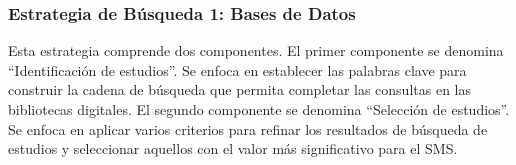 \subsubsection{Estrategia de Búsqueda 1: Bases de Datos}\label{subsubsec:busqueda-bases-datos}

\newcommand{\wos}{933}
\newcommand{\ieee}{3022}
\newcommand{\spr}{35788}
\newcommand{\tf}{761}
\newcommand{\sd}{2539}
\newcommand{\tot}{43043}
\newcommand{\wosp}{\fpeval{round (\wos*100/\tot,2)}}
\newcommand{\ieeep}{\fpeval{round (\ieee*100/\tot,2)}}
\newcommand{\sprp}{\fpeval{round (\spr*100/\tot,2)}}
\newcommand{\tfp}{\fpeval{round (\tf*100/\tot,2)}}
\newcommand{\sdp}{\fpeval{round (\sd*100/\tot,2)}}


\newcommand{\iwos}{10}
\newcommand{\iieee}{124}
\newcommand{\ispr}{947}
\newcommand{\itf}{37}
\newcommand{\isd}{142}
\newcommand{\itot}{1260}
\newcommand{\iwosp}{\fpeval{round (\iwos*100/\itot,2)}}
\newcommand{\iieeep}{\fpeval{round (\iieee*100/\itot,2)}}
\newcommand{\isprp}{\fpeval{round (\ispr*100/\itot,2)}}
\newcommand{\itfp}{\fpeval{round (\itf*100/\itot,2)}}
\newcommand{\isdp}{\fpeval{round (\isd*100/\itot,2)}}

\newcommand{\numEstEx}{3}

\newcommand{\depTot}{\fpeval{\itot-\numEstEx}}

\newcommand{\screen}{1091}

\newcommand{\screenTot}{\fpeval{\depTot-\screen}}

Esta estrategia comprende dos componentes. El primer componente se denomina ``Identificación de estudios''. Se enfoca en establecer las 
palabras clave para construir la cadena de búsqueda que permita completar las consultas en las bibliotecas digitales. El segundo 
componente se denomina ``Selección de estudios''. Se enfoca en aplicar varios criterios para refinar los resultados de búsqueda de 
estudios y seleccionar aquellos con el valor más significativo para el SMS.\@

